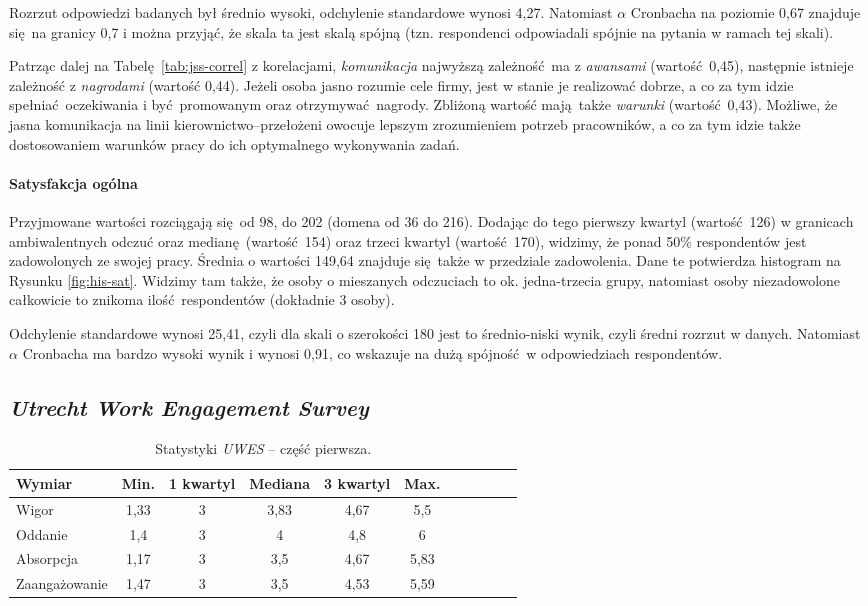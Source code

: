 Rozrzut odpowiedzi badanych był średnio wysoki, odchylenie standardowe wynosi 4,27. Natomiast $\alpha$ Cronbacha na poziomie 0,67 znajduje się na granicy 0,7 i można przyjąć, że skala ta jest skalą spójną (tzn. respondenci odpowiadali spójnie na pytania w ramach tej skali).

Patrząc dalej na Tabelę \ref{tab:jss-correl} z korelacjami, \textit{komunikacja} najwyższą zależność ma z \textit{awansami} (wartość 0,45), następnie istnieje zależność z \textit{nagrodami} (wartość 0,44). Jeżeli osoba jasno rozumie cele firmy, jest w stanie je realizować dobrze, a co za tym idzie spełniać oczekiwania i być promowanym oraz otrzymywać nagrody. Zbliżoną wartość mają także \textit{warunki} (wartość 0,43). Możliwe, że jasna komunikacja na linii
kierownictwo--przełożeni owocuje lepszym zrozumieniem potrzeb pracowników, a co za tym idzie także dostosowaniem warunków pracy do ich optymalnego wykonywania zadań.

\paragraph{Satysfakcja ogólna}
Przyjmowane wartości rozciągają się od 98, do 202 (domena od 36 do 216). Dodając do tego pierwszy kwartyl (wartość 126) w granicach ambiwalentnych odczuć oraz medianę (wartość 154) oraz trzeci kwartyl (wartość 170), widzimy, że ponad 50\% respondentów jest zadowolonych ze swojej pracy. Średnia o wartości 149,64 znajduje się także w przedziale zadowolenia. Dane te potwierdza histogram na Rysunku \ref{fig:his-sat}. Widzimy tam także, że osoby o mieszanych odczuciach to ok.
jedna-trzecia grupy, natomiast osoby niezadowolone całkowicie to znikoma ilość respondentów (dokładnie 3 osoby).

Odchylenie standardowe wynosi 25,41, czyli dla skali o szerokości 180 jest to średnio-niski wynik, czyli średni rozrzut w danych. Natomiast $\alpha$ Cronbacha ma bardzo wysoki wynik i wynosi 0,91, co wskazuje na dużą spójność w odpowiedziach respondentów.

\FloatBarrier

\subsection{\emph{Utrecht Work Engagement Survey}}

\begin{table}[h!]
\begin{center}
\begin{tabular}{l | c c c c c c c c c c}
Wymiar & Min. & 1 kwartyl & Mediana & 3 kwartyl & Max.\\ \hline \hline
Wigor & 1,33 & 3 & 3,83 & 4,67 & 5,5 \\
Oddanie & 1,4 & 3 & 4 & 4,8 & 6 \\
Absorpcja & 1,17 & 3 & 3,5 & 4,67 & 5,83 \\ \hline
Zaangażowanie & 1,47 & 3 & 3,5 & 4,53 & 5,59 \\
\end{tabular}
\end{center}
\caption{Statystyki \emph{UWES} -- część pierwsza.}
\label{tab:uwes-stats-1}
\end{table}

